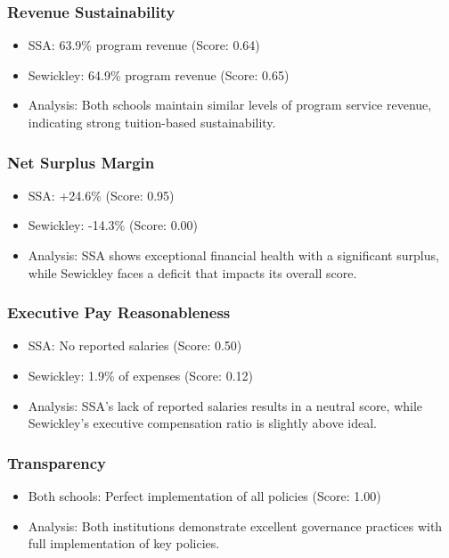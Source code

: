\documentclass[12pt]{article}
\begin{document}
\subsubsection{Revenue Sustainability}
\begin{itemize}
    \item SSA: 63.9\% program revenue (Score: 0.64)
    \item Sewickley: 64.9\% program revenue (Score: 0.65)
    \item Analysis: Both schools maintain similar levels of program service revenue, indicating strong tuition-based sustainability.
\end{itemize}

\subsubsection{Net Surplus Margin}
\begin{itemize}
    \item SSA: +24.6\% (Score: 0.95)
    \item Sewickley: -14.3\% (Score: 0.00)
    \item Analysis: SSA shows exceptional financial health with a significant surplus, while Sewickley faces a deficit that impacts its overall score.
\end{itemize}

\subsubsection{Executive Pay Reasonableness}
\begin{itemize}
    \item SSA: No reported salaries (Score: 0.50)
    \item Sewickley: 1.9\% of expenses (Score: 0.12)
    \item Analysis: SSA's lack of reported salaries results in a neutral score, while Sewickley's executive compensation ratio is slightly above ideal.
\end{itemize}

\subsubsection{Transparency}
\begin{itemize}
    \item Both schools: Perfect implementation of all policies (Score: 1.00)
    \item Analysis: Both institutions demonstrate excellent governance practices with full implementation of key policies.
\end{itemize}
\end{document}
